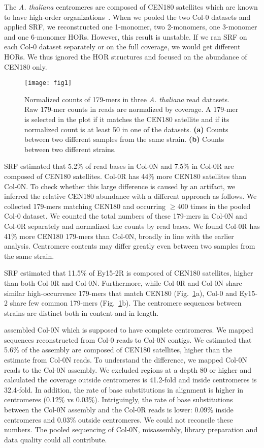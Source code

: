 \documentclass{bioinfo}
\begin{document}
The \emph{A. thaliana} centromeres are composed of CEN180 satellites which are
known to have high-order organizations~\citep{Naish:2021aa}. When we pooled the
two Col-0 datasets and applied SRF, we reconstructed one 1-monomer, two
2-monomers, one 3-monomer and one 6-monomer HORs. However, this result is
unstable. If we ran SRF on each Col-0 dataset separately or on the full
coverage, we would get different HORs. We thus ignored the HOR structures and
focused on the abundance of CEN180 only.

\begin{figure}[!tb]
\texttt{[image: fig1]}
\caption{Normalized counts of 179-mers in three \emph{A. thaliana} read
datasets. Raw 179-mer counts in reads are normalized by coverage. A 179-mer is
selected in the plot if it matches the CEN180 satellite and if its normalized
count is at least 50 in one of the datasets. {\bf (a)} Counts between two
different samples from the same strain. {\bf (b)} Counts between two different
strains.}\label{fig:1}
\end{figure}

SRF estimated that 5.2\% of read bases in Col-0N and 7.5\% in Col-0R are
composed of CEN180 satellites. Col-0R has 44\% more CEN180 satellites than
Col-0N. To check whether this large difference is caused by an artifact, we
inferred the relative CEN180 abundance with a different approach as follows.
We collected 179-mers matching CEN180 and occurring $\ge$400 times in the
pooled Col-0 dataset. We counted the total numbers of these 179-mers in Col-0N
and Col-0R separately and normalized the counts by read bases. We found Col-0R
has 41\% more CEN180 179-mers than Col-0N, broadly in line with the earlier
analysis. Centromere contents may differ greatly even between two samples from
the same strain.

SRF estimated that 11.5\% of Ey15-2R is composed of CEN180 satellites, higher
than both Col-0R and Col-0N. Furthermore, while Col-0R and Col-0N share similar
high-occurrence 179-mers that match CEN180 (Fig.~\ref{fig:1}a), Col-0 and
Ey15-2 share few common 179-mers (Fig.~\ref{fig:1}b). The centromere sequences
between strains are distinct both in content and in length.

\citet{Naish:2021aa} assembled Col-0N which is supposed to have complete
centromeres. We mapped sequences reconstructed from Col-0 reads to Col-0N
contigs. We estimated that 5.6\% of the assembly are composed of CEN180
satellites, higher than the estimate from Col-0N reads. To understand the
difference, we mapped Col-0N reads to the Col-0N assembly. We excluded regions
at a depth 80 or higher and calculated the coverage outside centromeres is
41.2-fold and inside centromeres is 32.4-fold. In addition, the rate of base
substitutions in alignment is higher in centromeres (0.12\% vs 0.03\%).
Intriguingly, the rate of base substitutions between the Col-0N assembly and
the Col-0R reads is lower: 0.09\% inside centromeres and 0.03\% outside
centromeres. We could not reconcile these numbers. The pooled sequencing of
Col-0N, misassembly, library preparation and data quality could all contribute.
\end{document}
